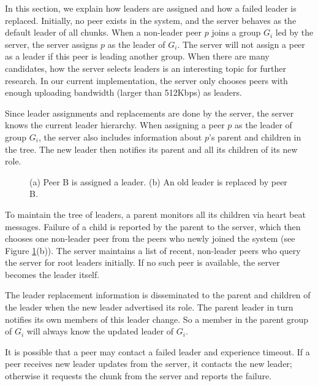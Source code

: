     In this section, we explain how leaders are assigned and
    how a failed leader is replaced.
    Initially, no peer exists in the system, and the server
    behaves as the default leader of all chunks. When a
    non-leader peer $p$ joins a group $G_i$ led by the
    server, the server assigns $p$ as the leader of $G_i$.
    The server will not assign a peer as a leader if this
    peer is leading another group.
    When there are many candidates, how the server selects leaders
    is an interesting topic for further research. In our current
    implementation, the server only chooses peers with enough
    uploading bandwidth (larger than 512Kbps) as leaders.

    Since leader assignments and replacements are done by 
    the server, the server knows the current leader hierarchy.
    When assigning a peer $p$ as the leader of group $G_i$, the
    server also includes information about $p$'s parent and 
    children in the tree.  The new leader then notifies its 
    parent and all its children of its new role.   

    \begin{figure}[t]
    \centering
    \caption{(a) Peer B is assigned a leader. (b) An old leader is
    replaced by peer B. 
    \label{f:leader_assign}}
    \end{figure}

    To maintain the tree of leaders, a parent monitors all
    its children via heart beat messages.  Failure of a
    child is reported by the parent to the server, which
    then chooses one non-leader peer from the peers who
    newly joined the system (see Figure \ref{f:leader_assign}(b)).  
    The server maintains a list of recent, non-leader peers 
    who query the server for root leaders initially. 
    If no such peer is available, the server becomes the leader 
    itself.  
    
    The leader replacement information is disseminated
    to the parent and children of the leader when the new leader
    advertised its role. The parent leader in turn notifies
    its own members of this leader change. So a member in the parent
    group of $G_i$ will always know the updated leader
    of $G_i$. 

    It is possible that a peer may contact a failed leader
    and experience timeout.  If a peer receives new leader
    updates from the server, it contacts the new leader;
    otherwise it requests the chunk from the server and 
    reports the failure.
    
